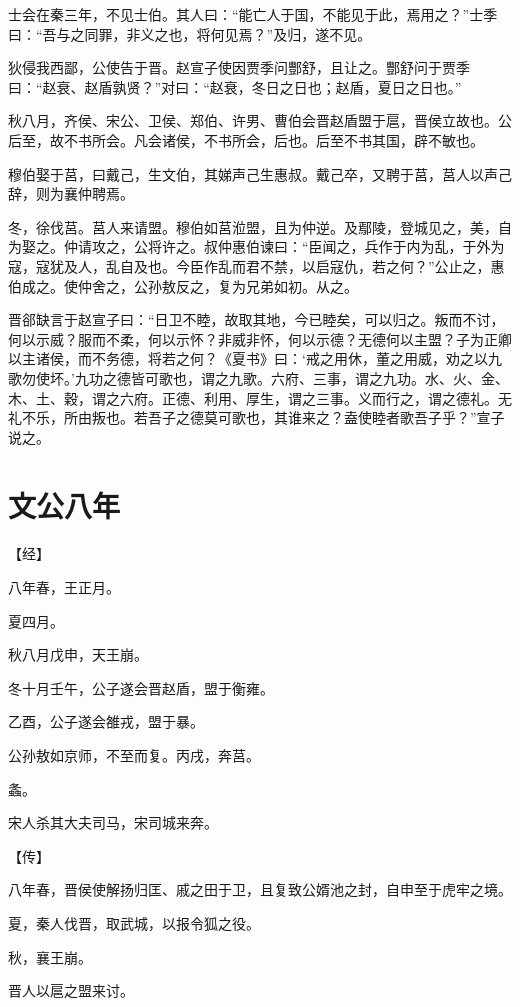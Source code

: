\documentclass[a4paper,12pt,UTF8,twoside]{ctexbook}
\begin{document}
士会在秦三年，不见士伯。其人曰：“能亡人于国，不能见于此，焉用之？”士季曰：“吾与之同罪，非义之也，将何见焉？”及归，遂不见。

狄侵我西鄙，公使告于晋。赵宣子使因贾季问酆舒，且让之。酆舒问于贾季曰：“赵衰、赵盾孰贤？”对曰：“赵衰，冬日之日也；赵盾，夏日之日也。”

秋八月，齐侯、宋公、卫侯、郑伯、许男、曹伯会晋赵盾盟于扈，晋侯立故也。公后至，故不书所会。凡会诸侯，不书所会，后也。后至不书其国，辟不敏也。

穆伯娶于莒，曰戴己，生文伯，其娣声己生惠叔。戴己卒，又聘于莒，莒人以声己辞，则为襄仲聘焉。

冬，徐伐莒。莒人来请盟。穆伯如莒涖盟，且为仲逆。及鄢陵，登城见之，美，自为娶之。仲请攻之，公将许之。叔仲惠伯谏曰：“臣闻之，兵作于内为乱，于外为寇，寇犹及人，乱自及也。今臣作乱而君不禁，以启寇仇，若之何？”公止之，惠伯成之。使仲舍之，公孙敖反之，复为兄弟如初。从之。

晋郤缺言于赵宣子曰：“日卫不睦，故取其地，今已睦矣，可以归之。叛而不讨，何以示威？服而不柔，何以示怀？非威非怀，何以示德？无德何以主盟？子为正卿以主诸侯，而不务德，将若之何？《夏书》曰：‘戒之用休，董之用威，劝之以九歌勿使坏。’九功之德皆可歌也，谓之九歌。六府、三事，谓之九功。水、火、金、木、土、穀，谓之六府。正德、利用、厚生，谓之三事。义而行之，谓之德礼。无礼不乐，所由叛也。若吾子之德莫可歌也，其谁来之？盍使睦者歌吾子乎？”宣子说之。

\section{文公八年}



【经】

八年春，王正月。

夏四月。

秋八月戊申，天王崩。

冬十月壬午，公子遂会晋赵盾，盟于衡雍。

乙酉，公子遂会雒戎，盟于暴。

公孙敖如京师，不至而复。丙戌，奔莒。

螽。

宋人杀其大夫司马，宋司城来奔。

【传】

八年春，晋侯使解扬归匡、戚之田于卫，且复致公婿池之封，自申至于虎牢之境。

夏，秦人伐晋，取武城，以报令狐之役。

秋，襄王崩。

晋人以扈之盟来讨。
\end{document}
